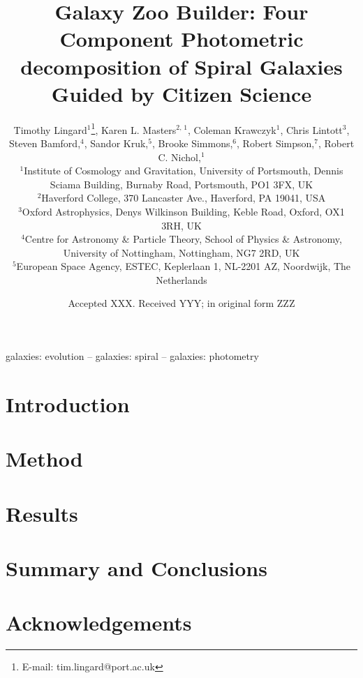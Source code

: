 \documentclass[fleqn,usenatbib]{mnras}
\title[Galaxy Zoo Builder: Method paper]{Galaxy Zoo Builder: Four Component Photometric decomposition of Spiral Galaxies Guided by Citizen Science}
\author[T. Lingard et al.]{
  Timothy Lingard$^{1}$\thanks{E-mail: tim.lingard@port.ac.uk},
  Karen L. Masters$^{2,\,1}$,
  Coleman Krawczyk$^{1}$,
  Chris Lintott$^{3}$,
  \newauthor
  Steven Bamford,$^{4}$,
  Sandor Kruk,$^{5}$,
  Brooke Simmons,$^{6}$,
  Robert Simpson,$^{7}$,
  \newauthor
  Robert C. Nichol,$^{1}$
  \\
  $^{1}$Institute of Cosmology and Gravitation, University of Portsmouth, Dennis Sciama Building, Burnaby Road, Portsmouth, PO1 3FX, UK\\
  $^{2}$Haverford College, 370 Lancaster Ave., Haverford, PA 19041, USA\\
  $^{3}$Oxford Astrophysics, Denys Wilkinson Building, Keble Road, Oxford, OX1 3RH, UK\\
  $^{4}$Centre for Astronomy \& Particle Theory, School of Physics \& Astronomy, University of Nottingham, Nottingham, NG7 2RD, UK\\
  $^{5}$European Space Agency, ESTEC, Keplerlaan 1, NL-2201 AZ, Noordwijk, The Netherlands
}
\date{Accepted XXX. Received YYY; in original form ZZZ}
\begin{document}
\label{firstpage}
\pagerange{\pageref{firstpage}--\pageref{lastpage}}
\maketitle

\begin{abstract}

\end{abstract}

\begin{keywords}
galaxies: evolution -- galaxies: spiral -- galaxies: photometry
\end{keywords}



\section{Introduction}


\section{Method}


\section{Results}


\section{Summary and Conclusions}


\section{Acknowledgements}








\appendix





\bsp	%
\label{lastpage}
\end{document}
